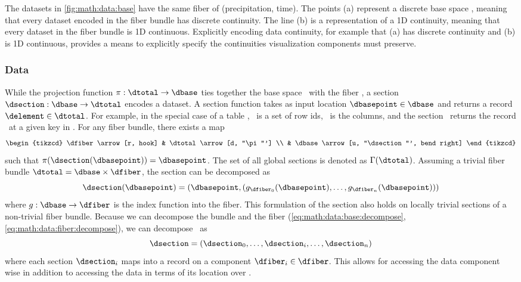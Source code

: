 \documentclass[../main.tex]{subfiles}
\begin{document}
The datasets in \autoref{fig:math:data:base} have the same fiber of (precipitation, time). The points (a) represent a discrete base space \dbase, meaning that every dataset encoded in the fiber bundle has discrete continuity. The line (b) is a representation of a 1D continuity, meaning that every dataset in the fiber bundle is 1D continuous. Explicitly encoding data continuity, for example that (a) has discrete continuity and (b) is 1D continuous, provides a means to explicitly specify the continuities visualization components must preserve. 
 
\subsubsection{Data \dsection}
\label{sec:math:data:section}
While the projection function $\pi:\dtotal \rightarrow\dbase$ ties together the base space \dbase\ with the fiber \dfiber, a section $\dsection: \dbase\rightarrow \dtotal$ encodes a dataset. A section function takes as input location $\dbasepoint \in \dbase$ and returns a record $\delement \in \dtotal$. For example, in the special case of a table \cite{spivakSIMPLICIALDATABASES}, \dbase\ is a set of row ids, \dfiber\ is the columns, and the section \dsection\ returns the record \delement\ at a given key in \dbase. For any fiber bundle, there exists a map
\begin{equation}
    \begin{tikzcd}
        \dfiber \arrow[r, hook] & \dtotal \arrow[d, "\pi"'] \\
                          & \dbase \arrow[u, "\dsection"', bend right]
    \end{tikzcd}
\end{equation}
 such that $\pi(\dsection(\dbasepoint)) = \dbasepoint$. The set of all global sections is denoted as $\Gamma(\dtotal)$. Assuming a trivial fiber bundle $\dtotal = \dbase \times \dfiber$, the section can be decomposed as 
\begin{equation}
    \label{eq:section_return}
    \dsection(\dbasepoint) = (\dbasepoint, (g_{\dfiber_{0}}(\dbasepoint), \ldots, g_{\dfiber_{n}}(\dbasepoint)))
\end{equation}
where $g: \dbase \rightarrow \dfiber$ is the index function into the fiber. This formulation of the section also holds on locally trivial sections of a non-trivial fiber bundle. Because we can decompose the bundle and the fiber (\autoref{eq:math:data:base:decompose}, \autoref{eq:math:data:fiber:decompose}), we can decompose \dsection\ as 
\begin{equation}
\label{eq:math:data:section:decompose}
\dsection= (\dsection_0,\ldots, \dsection_i, \dots, \dsection_n) 
\end{equation}
where each section $\dsection_i$ maps into a record on a component $\dfiber_i \in \dfiber$. This allows for accessing the data component wise in addition to accessing the data in terms of its location over \dbase.
\end{document}
